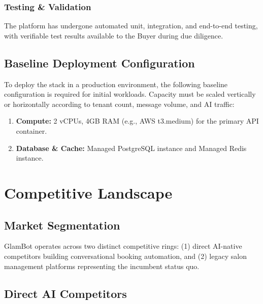 \documentclass[11pt,a4paper]{report}
\begin{document}
\subsection{Testing \& Validation}
The platform has undergone automated unit, integration, and end-to-end testing, with verifiable test results available to the Buyer during due diligence. 

\section{Baseline Deployment Configuration}
To deploy the stack in a production environment, the following baseline configuration is required for initial workloads. Capacity must be scaled vertically or horizontally according to tenant count, message volume, and AI traffic:
\begin{enumerate}
    \item \textbf{Compute:} 2 vCPUs, 4GB RAM (e.g., AWS t3.medium) for the primary API container.
    \item \textbf{Database \& Cache:} Managed PostgreSQL instance and Managed Redis instance.
\end{enumerate}

\chapter{Competitive Landscape}

\section{Market Segmentation}
GlamBot operates across two distinct competitive rings: (1) direct AI-native competitors building conversational booking automation, and (2) legacy salon management platforms representing the incumbent status quo.

\section{Direct AI Competitors}
\end{document}
